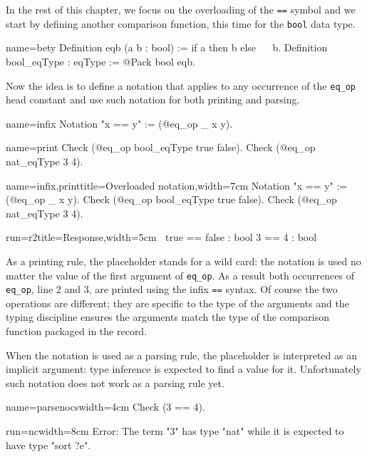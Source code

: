 In the rest of this chapter, we focus on the overloading of the
\lstinline/==/ symbol and we start by defining another comparison
function, this time for the \lstinline/bool/ data type.

\begin{coq}{name=bety}{}
Definition eqb (a b : bool) := if a then b else ~~ b.
Definition bool_eqType : eqType := @Pack bool eqb.
\end{coq}

Now the idea is to define a notation that applies to any occurrence
of the \lstinline/eq_op/ head constant and use such
notation for both printing and parsing.

\begin{coqdef}{name=infix}
Notation "x == y" := (@eq_op _ x y).
\end{coqdef}
\begin{coqdef}{name=print}
Check (@eq_op bool_eqType true false).
Check (@eq_op nat_eqType 3 4).
\end{coqdef}
\begin{coq-left}{name=infix,print}{title=Overloaded notation,width=7cm}
Notation "x == y" := (@eq_op _ x y).
Check (@eq_op bool_eqType true false).
Check (@eq_op nat_eqType 3 4).
\end{coq-left}
\begin{coqout-right}{run=r2}{title=Response,width=5cm}
$~$
true == false : bool
3 == 4 : bool
\end{coqout-right}

As a printing rule, the placeholder stands for a wild card: the
notation is used no matter the value of the first argument of
\lstinline/eq_op/.  As a result both occurrences of \lstinline/eq_op/,
line 2 and 3, are printed using the infix \lstinline/==/ syntax.
Of course the two operations are different; they are specific to the
type of the arguments and the typing discipline ensures the
arguments match the type of the comparison function packaged in
the record.

When the notation is used as a parsing rule, the placeholder is
interpreted as an implicit argument: type inference is expected to find a value
for it.  Unfortunately such notation does not work as a parsing rule
yet.

\begin{coq-left}{name=parsenocs}{width=4cm}
Check (3 == 4).
$~$
\end{coq-left}
\begin{coqout-right}{run=nc}{width=8cm}
Error: The term "3" has type "nat" while
it is expected to have type "sort ?e".
\end{coqout-right}

